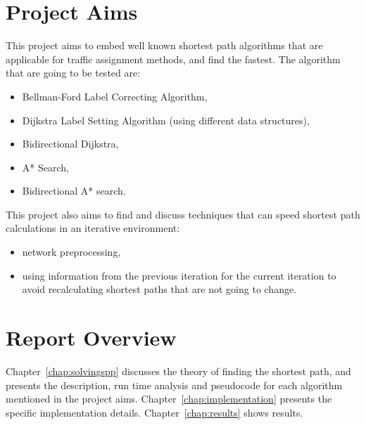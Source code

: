 \section{Project Aims}
This project aims to embed well known shortest path algorithms that are applicable for traffic assignment methods, and find the fastest.
The algorithm that are going to be tested are:
\begin{itemize}
    \item Bellman-Ford Label Correcting Algorithm,
    \item Dijkstra Label Setting Algorithm (using different data structures),
    \item Bidirectional Dijkstra,
    \item A* Search,
    \item Bidirectional A* search.
\end{itemize}

This project also aims to find and discuss techniques that can speed shortest path calculations in an iterative environment:
\begin{itemize}
    \item network preprocessing,
    \item using information from the previous iteration for the current iteration to avoid recalculating shortest paths that are not going to change.
\end{itemize}

\section{Report Overview}
Chapter~\ref{chap:solvingspp} discusses the theory of finding the shortest path,
and presents the description, run time analysis and pseudocode for each algorithm mentioned in the project aims.
Chapter~\ref{chap:implementation} presents the specific implementation details.
Chapter~\ref{chap:results} shows results.


